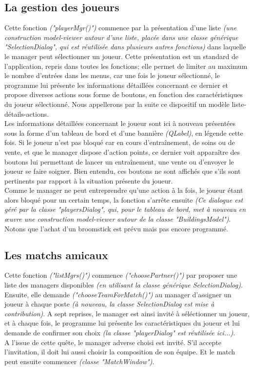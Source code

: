 \documentclass[a4paper,titlepage]{scrreprt}
\begin{document}
\subsection{La gestion des joueurs}
Cette fonction \emph{("playerMgr()")} commence par la présentation d'une liste
\emph{(une construction model-viewer autour d'une liste, placée dans une classe générique "SelectionDialog",
qui est réutilisée dans plusieurs autres fonctions)}
dans laquelle le manager peut sélectionner un joueur.
Cette présentation est un standard de l'application, repris dans toutes les fonctions;
elle permet de limiter au maximum le nombre d'entrées dans les menus,
car une fois le joueur sélectionné,
le programme lui présente les informations détaillées concernant ce dernier
et propose diverses actions sous forme de boutons,
en fonction des caractéristiques du joueur sélectionné.
Nous appellerons par la suite ce dispositif un modèle liste-détails-actions.\\
Les informations détaillées concernant le joueur sont ici à nouveau présentées sous la forme
d'un tableau de bord et d'une bannière \emph{(QLabel)}, en légende cette fois.
Si le joueur n'est pas bloqué car en cours d'entraînement, de soins ou de vente,
et que le manager dispose d'action points,
ce dernier voit apparaître des boutons lui permettant de lancer un entraînement, une vente
ou d'envoyer le joueur se faire soigner.
Bien entendu, ces boutons ne sont affichés que s'ils sont pertinents
par rapport à la situation présente du joueur.\\
Comme le manager ne peut entreprendre qu'une action à la fois,
le joueur étant alors bloqué pour un certain temps, la fonction s'arrête ensuite
\emph{(Ce dialogue est géré par la classe "playersDialog", qui, pour le tableau de bord,
met à nouveau en \oe uvre une construction model-viewer autour de la classe "BuildingsModel")}.
Notons que l'achat d'un broomstick est prévu mais pas encore programmé.
\subsection{Les matchs amicaux}
Cette fonction \emph{("listMgrs()")} commence \emph{("choosePartner()")} par proposer une liste
des managers disponibles \emph{(en utilisant la classe générique SelectionDialog)}.\\
Ensuite, elle demande \emph{("chooseTeamForMatch()")} au manager d'assigner
un joueur à chaque poste \emph{(à nouveau, la classe SelectionDialog est mise à contribution)}.
A sept reprises, le manager est ainsi invité à séléctionner un joueur,
et à chaque fois, le programme lui présente les caractéristiques du joueur
et lui demande de confirmer son choix \emph{(la classe "playerDialog" est réutilisée ici...)}.\\
A l'issue de cette quête, le manager adverse choisi est invité. S'il accepte l'invitation,
il doit lui aussi choisir la composition de son équipe. Et le match peut ensuite commencer \emph{(classe "MatchWindow")}.
\end{document}
